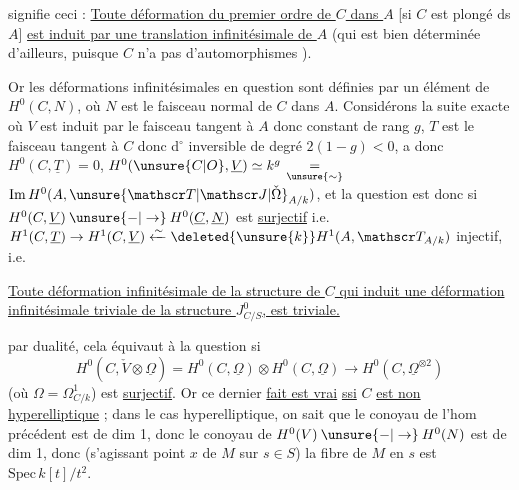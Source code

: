 

signifie ceci :  \uline{Toute déformation  du premier ordre de $C$ dans $A$} [si $C$ est plongé  ds $A$] \uline{est induit par une translation infinitésimale de $A$} (qui est bien déterminée d'ailleurs, puisque $C$ n'a pas d'automorphismes ).

Or  les déformations infinitésimales en question sont définies par un élément de $H^0(C,N)$, où $N$ est le faisceau normal de $C$ dans $A$. Considérons la suite exacte
où $V$ est induit par le faisceau tangent à $A$ donc constant de rang $g$, $T$ est le faisceau tangent à $C$ donc d$^\circ$ inversible de degré $2(1-g)<0$,   a donc $H^0(C,\underline T)=0$, $H^0(\unsure{C|O},\underline V)\simeq k^g$ $\underset{\unsure{\sim}}{=}$  $\mathrm{Im}\,H^0(A,\unsure{\mathscr T|\mathscr J|\check{\Omega}}_{A/k})$, et la question est donc  si $H^0(C,\underline V)\mathbin{\unsure{-|\to}}H^0(\underline C,\underline N)$ est \uline{surjectif} i.e. $H^1(C,\underline T)\to H^1(C,\underline V)\xleftarrow{\sim}\deleted{\unsure{k}}H^1(A,\mathscr T_{A/k})$ injectif, i.e.



 \uline{Toute déformation infinitésimale  de la structure de $C$ qui induit une déformation infinitésimale triviale de la structure $J^0_{C/S}$, est triviale.}

 par dualité, cela équivaut à la question si
\[
H^0(C,\check V\otimes\underline\Omega)=H^0(C,\underline\Omega)\otimes H^0(C,\underline\Omega)\longrightarrow H^0(C,\underline\Omega^{\otimes 2})
\]
(où $\Omega=\Omega^1_{C/k}$) est \uline{surjectif}. Or ce dernier \uline{fait est vrai} \uline{ssi} $C$ \uline{est non hyperelliptique} ; dans le cas  hyperelliptique, on sait que le conoyau de l'hom précédent est de dim 1, donc le conoyau de $H^0(V)\mathbin{\unsure{-|\to}}H^0(N)$ est de dim 1, donc (s'agissant  point $x$ de $M$  sur $s\in S$) la fibre de $M$ en $s$ est $\mathrm{Spec}\,k[t]/t^2$.

